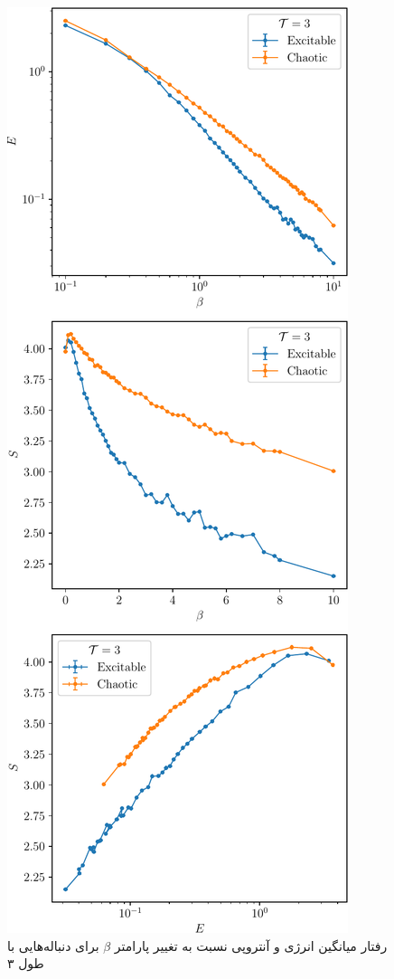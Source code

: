 \begin{figure}
    \centering
    \includegraphics[height=0.9\textheight]{figures/bp_3}
    \caption{
        رفتار میانگین انرژی و آنتروپی نسبت به تغییر پارامتر
        \( \beta \)
        برای دنباله‌هایی با طول ۳
    }
    \label{fig:bp_3}
\end{figure}

